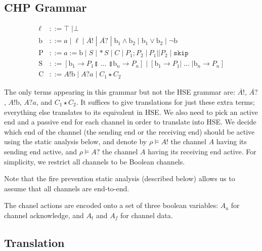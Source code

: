 \documentclass[times, 10pt]{article}
\begin{document}
\subsection{CHP Grammar}
\begin{align*}
    \ell & ::= \top \; | \bot \\
    \mathrm{b} & ::= a \; | \; \ell \; | \; \overline{A!} \; | \; \overline{A?} \; | \; \mathrm{b}_1 \wedge \mathrm{b}_2 \; | \; \mathrm{b}_1 \vee \mathrm{b}_2 \; | \; \lnot \mathrm{b} \\
    \mathrm{P} & ::= a := \mathrm{b} \; | \; S \; | \, *S \; | \; C \; | \; P_1; P_2 \; | \: P_1 || P_2 \; | \; \mathtt{skip} \\
    \mathrm{S} & ::= [ \mathrm{b}_1 \rightarrow P_1 \talloblong \; \ldots \; \talloblong \mathrm{b}_n \rightarrow P_n ] \; | \; [ \mathrm{b}_1 \rightarrow P_1 | \; \ldots \; | \mathrm{b}_n \rightarrow P_n ] \\
    \mathrm{C} & ::= A!\mathrm{b} \; | \; A?a \; | \; C_1 \star C_2
\end{align*}

The only terms appearing in this grammar but not the HSE grammar are:
$\overline{A!}$, $\overline{A?}$, $A!\mathrm{b}$, $A?a$, and $C_1 \star C_2$.
It suffices to give translations for just these extra terms; everything else
translates to its equivalent in HSE. We also need to pick an active end and a
passive end for each channel in order to translate into HSE.  We decide which
end of the channel (the sending end or the receiving end) should be active using
the static analysis below, and denote by $\rho \vDash A!$ the channel $A$ having
its sending end active, and $\rho \vDash A?$ the channel $A$ having its
receiving end active.  For simplicity, we restrict all channels to be Boolean
channels.

Note that the fire prevention static analysis (described below) allows us to assume that all
channels are end-to-end.

The chanel actions are encoded onto a set of three boolean variables: $A_a$ for
channel acknowledge, and $A_t$ and $A_f$ for channel data.

\subsection{Translation}

\end{document}
